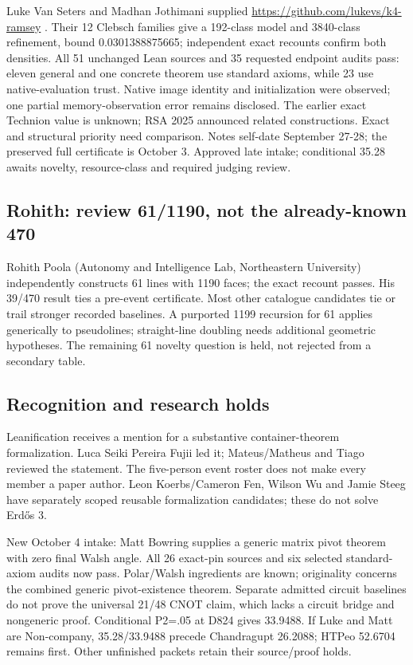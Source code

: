 \documentclass[10pt,a4paper]{article}
\begin{document}
Luke Van Seters and Madhan Jothimani supplied \url{https://github.com/lukevs/k4-ramsey} . Their 12 Clebsch families give a 192-class model and 3840-class refinement, bound 0.0301388875665; independent exact recounts confirm both densities. All 51 unchanged Lean sources and 35 requested endpoint audits pass: eleven general and one concrete theorem use standard axioms, while 23 use native-evaluation trust. Native image identity and initialization were observed; one partial memory-observation error remains disclosed. The earlier exact Technion value is unknown; RSA 2025 announced related constructions. Exact and structural priority need comparison. Notes self-date September 27-28; the preserved full certificate is October 3. Approved late intake; conditional 35.28 awaits novelty, resource-class and required judging review.

\subsection{Rohith: review 61/1190, not the already-known 470}
Rohith Poola (Autonomy and Intelligence Lab, Northeastern University) independently constructs 61 lines with 1190 faces; the exact recount passes. His 39/470 result ties a pre-event certificate. Most other catalogue candidates tie or trail stronger recorded baselines. A purported 1199 recursion for 61 applies generically to pseudolines; straight-line doubling needs additional geometric hypotheses. The remaining 61 novelty question is held, not rejected from a secondary table.

\subsection{Recognition and research holds}
Leanification receives a mention for a substantive container-theorem formalization. Luca Seiki Pereira Fujii led it; Mateus/Matheus and Tiago reviewed the statement. The five-person event roster does not make every member a paper author. Leon Koerbs/Cameron Fen, Wilson Wu and Jamie Steeg have separately scoped reusable formalization candidates; these do not solve Erdős 3.

New October 4 intake: Matt Bowring supplies a generic matrix pivot theorem with zero final Walsh angle. All 26 exact-pin sources and six selected standard-axiom audits now pass. Polar/Walsh ingredients are known; originality concerns the combined generic pivot-existence theorem. Separate admitted circuit baselines do not prove the universal 21/48 CNOT claim, which lacks a circuit bridge and nongeneric proof. Conditional P2=.05 at D824 gives 33.9488. If Luke and Matt are Non-company, 35.28/33.9488 precede Chandragupt 26.2088; HTPeo 52.6704 remains first. Other unfinished packets retain their source/proof holds.
\end{document}
